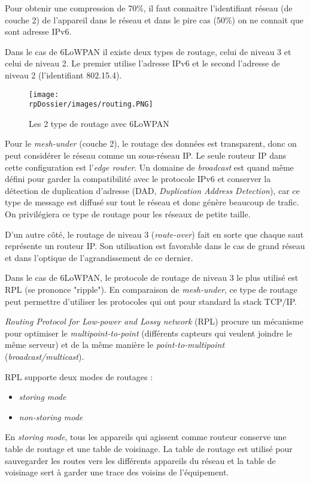 Pour obtenir une compression de 70\%, il faut connaitre l'identifiant réseau (de couche 2) de l'appareil dans le réseau et dans le pire cas (50\%) on ne connait que sont adresse IPv6.

Dans le cas de 6LoWPAN il existe deux types de routage, celui de niveau 3 et celui de niveau 2. Le premier utilise l'adresse IPv6 et le second l'adresse de niveau 2 (l'identifiant 802.15.4).

\begin{figure}[H]
\centering
\texttt{[image: \\rpDossier/images/routing.PNG]}
\caption{Les 2 type de routage avec 6LoWPAN}
\label{routing}
\end{figure}

Pour le  \textit{mesh-under} (couche 2), le routage des données est transparent, donc on peut considérer le réseau comme un sous-réseau IP. Le seule routeur IP dans cette configuration est l'\textit{edge router}. Un domaine de \textit{broadcast} est quand même défini pour garder la compatibilité avec le protocole IPv6 et  conserver la détection de duplication d'adresse (DAD, \textit{Duplication Address Detection}), car ce type de message est diffusé sur tout le réseau et donc génère beaucoup de trafic. On privilégiera ce type de routage pour les réseaux de petite taille.

D'un autre côté, le routage de niveau 3 (\textit{route-over}) fait en sorte que chaque saut représente un routeur IP. Son utilisation est favorable dans le cas de grand réseau et dans l'optique de l'agrandissement de ce dernier. 

Dans le cas de 6LoWPAN, le protocole de routage de niveau 3 le plus utilisé est RPL (se prononce "ripple"). En comparaison de \textit{mesh-under}, ce type de routage peut permettre d'utiliser les protocoles qui ont pour standard la stack TCP/IP.

\textit{Routing Protocol for Low-power and Lossy network} (RPL) procure un mécanisme pour optimiser le \textit{multipoint-to-point} (différents capteurs qui veulent joindre le même serveur) et de la même manière le \textit{point-to-multipoint} (\textit{broadcast/multicast}).

RPL supporte deux modes de routages : 
\begin{itemize}
\item \textit{storing mode}
\item \textit{non-storing mode}
\end{itemize}

En \textit{storing mode}, tous les appareils qui agissent comme routeur conserve une table de routage et une table de voisinage. La table de routage est utilisé pour sauvegarder les routes vers les différents appareils du réseau et la table de voisinage sert à garder une trace des voisins de l'équipement. 

